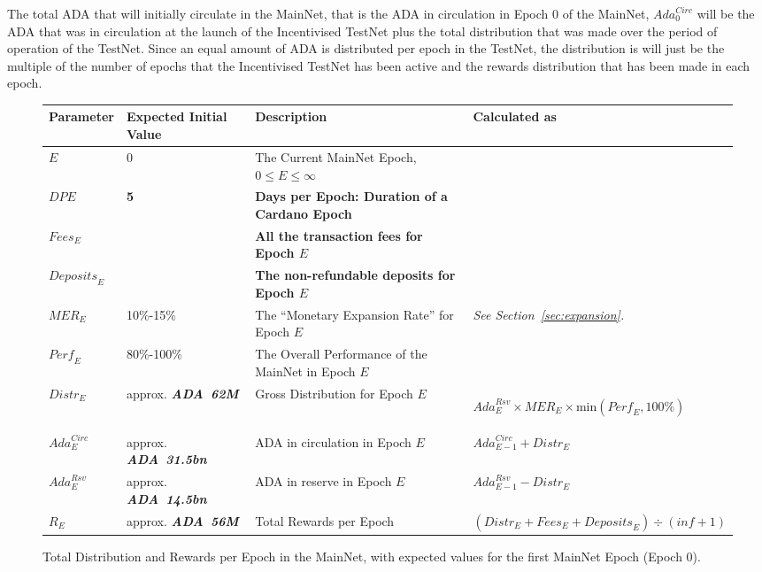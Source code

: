 \documentclass[11pt,a4paper,dvipsnames,twosided,final]{article}
\newcommand{\ada}{ADA{}}
\newcommand{\ADA}[1]{\textbf{\emph{\ada~{#1}}}}
\newcommand{\cardano}[1]{Cardano}
\begin{document}
\noindent
The total \ada{} that will initially circulate in the MainNet, that is the \ada{} in circulation in Epoch 0 of the MainNet,
$\textit{Ada}^{\textit{Circ}}_{0}$ will be the \ada{} that was in circulation at the launch of the Incentivised
TestNet plus the total distribution that was made over the period of operation of the TestNet.
Since an equal amount of \ada{} is distributed per epoch in
the TestNet,
the distribution is will just be the multiple of the number of epochs that the Incentivised TestNet has
been active and the rewards distribution that has been made in each epoch.


\begin{figure}[h!]
\begin{center}
\begin{tabular}{||l|p{2.4cm}|p{6cm}|p{3.9cm}||}
  \hline \hline
\textbf{Parameter} & \textbf{Expected Initial Value} & \textbf{Description} & \textbf{Calculated as} \\\hline
$\textit{E}$ & $0$ & The Current MainNet Epoch, $0 \le E \le \infty$ & \\\hline
\textbf{\color{green} $\textit{DPE}$} & \textbf{\color{green} 5} & \textbf{\color{green} Days per Epoch: Duration of a \cardano{} Epoch} & \\\hline
\textbf{\color{cyan} $\textit{Fees}_E$} & & \textbf{\color{cyan} All the transaction fees for Epoch $E$} & \\\hline
\textbf{\color{cyan} $\textit{Deposits}_E$} & & \textbf{\color{cyan} The non-refundable deposits for Epoch $E$} & \\\hline
$\textit{MER}_E$ & 10\%-15\% &  The ``Monetary Expansion Rate'' for Epoch $E$ & \emph{See Section~\ref{sec:expansion}.} \\\hline
$\textit{Perf}_E$ & 80\%-100\% &  The Overall Performance of the MainNet in Epoch $E$ &  \\\hline
$\textit{Distr}_E$ & approx. \ADA{62M} & Gross Distribution for Epoch $E$ & \begin{flushleft}$\textit{Ada}^{\textit{Rsv}}_E \times \textit{MER}_E \times \textrm{min}(\textit{Perf}_E, 100\%)$ \end{flushleft} \\\hline
$\textit{Ada}^{\textit{Circ}}_E$ & approx. \ADA{31.5bn}  & \ada{} in circulation in Epoch $E$ & $\textit{Ada}^{\textit{Circ}}_{E-1} + \textit{Distr}_E$ \\\hline
$\textit{Ada}^{\textit{Rsv}}_E$ & approx. \ADA{14.5bn} & \ada{} in reserve in Epoch $E$ & $\textit{Ada}^{\textit{Rsv}}_{E-1} - \textit{Distr}_E$ \\\hline
$R_E$ & approx. \ADA{56M} & Total Rewards per Epoch & $ (\textit{Distr}_E + \textit{Fees}_E + \textit{Deposits}_E) \div (\textit{inf}+1)$ \\\hline
  \hline
\end{tabular}
\end{center}
\caption{Total Distribution and Rewards per Epoch in the MainNet, with expected values for the first MainNet Epoch (Epoch 0).}
\end{figure}
\end{document}
